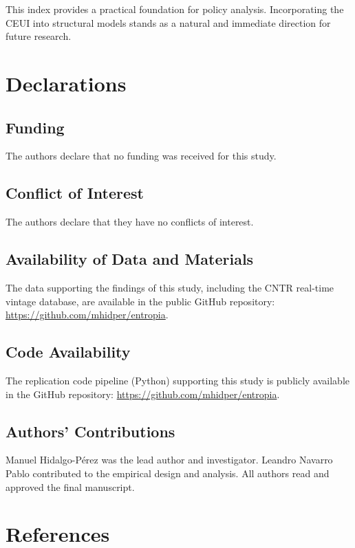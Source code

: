 \documentclass[12pt,a4paper]{article}
\theoremstyle{remark}
\begin{document}
This index provides a practical foundation for policy analysis. Incorporating the CEUI into structural models stands as a natural and immediate direction for future research.

\section*{Declarations}

\subsection*{Funding}
The authors declare that no funding was received for this study.

\subsection*{Conflict of Interest}
The authors declare that they have no conflicts of interest.

\subsection*{Availability of Data and Materials}
The data supporting the findings of this study, including the CNTR real-time vintage database, are available in the public GitHub repository: \url{https://github.com/mhidper/entropia}.

\subsection*{Code Availability}
The replication code pipeline (Python) supporting this study is publicly available in the GitHub repository: \url{https://github.com/mhidper/entropia}.

\subsection*{Authors' Contributions}
Manuel Hidalgo-Pérez was the lead author and investigator. Leandro Navarro Pablo contributed to the empirical design and analysis. All authors read and approved the final manuscript.

\pagebreak
\section*{References} \label{sec:references}
\renewcommand{\bibsection}{}


\end{document}
